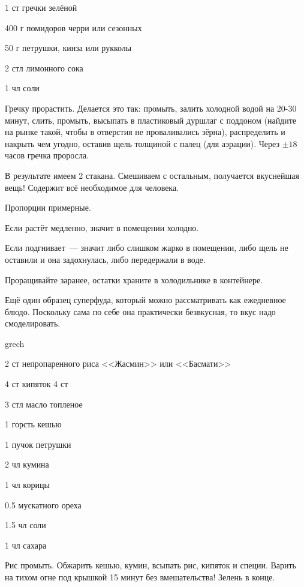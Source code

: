 {
\item 1 ст гречки зелёной
\item 400 г помидоров черри или сезонных 
\item 50 г петрушки, кинза или рукколы
}{
\item 2 стл лимонного сока 
\item 1 чл соли
}{
Гречку прорастить. Делается это так: промыть, залить холодной водой на 20-30 минут, слить, промыть, высыпать в пластиковый дуршлаг с поддоном (найдите на рынке такой, чтобы в отверстия не проваливались зёрна), распределить и накрыть чем угодно, оставив щель толщиной с палец (для аэрации). Через $\pm18$ часов гречка проросла.

В результате имеем 2 стакана. Смешиваем с остальным, получается вкуснейшая вещь! Содержит всё необходимое для человека.
}{
\begin{advice}
    \item Пропорции примерные.
\item Если растёт медленно, значит в помещении холодно.
    \item Если подгнивает~--- значит либо слишком жарко в помещении, либо щель не оставили и она задохнулась, либо передержали в воде.
\item Проращивайте заранее, остатки храните в холодильнике в контейнере.
    \item Ещё один образец суперфуда, который можно рассматривать как ежедневное блюдо. Поскольку сама по себе она практически безвкусная, то вкус надо смоделировать.
\end{advice}}{grech}



{
\item 2 ст непропаренного риса <<Жасмин>> или <<Басмати>> 
\item 4 ст кипяток 4 ст
\item 3 стл масло топленое 
\item 1 горсть кешью 
\item 1 пучок петрушки
}{
\item 2 чл кумина
\item 1 чл корицы
\item 0.5 мускатного ореха
\item 1.5 чл соли
\item 1 чл сахара
}{
Рис промыть. Обжарить кешью, кумин, всыпать рис, кипяток и специи. Варить на тихом огне под крышкой 15 минут без вмешательства! Зелень в конце.
}{}{}




